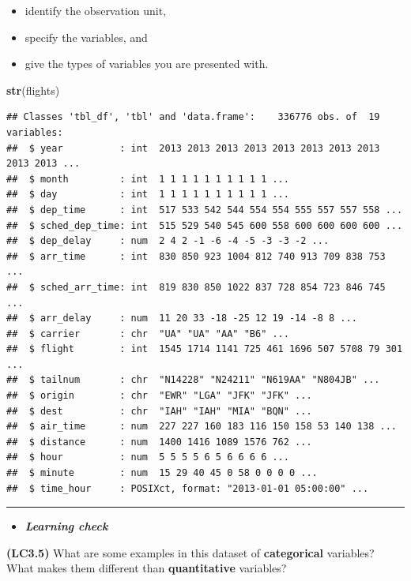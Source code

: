 \documentclass[]{tufte-book}
\newenvironment{Shaded}{\begin{snugshade}}{\end{snugshade}}
\newcommand{\KeywordTok}[1]{\textcolor[rgb]{0.13,0.29,0.53}{\textbf{{#1}}}}
\newcommand{\NormalTok}[1]{{#1}}
\providecommand{\tightlist}{%
  \setlength{\itemsep}{0pt}\setlength{\parskip}{0pt}}
\newenvironment{rmdblock}[1]
  {\begin{shaded*}
  \begin{itemize}
  \renewcommand{\labelitemi}{
    \raisebox{-.7\height}[0pt][0pt]{
    }
  }
  \item
  }
  {
  \end{itemize}
  \end{shaded*}
  }
\newenvironment{learncheck}
  {\begin{rmdblock}{warning}}
  {\end{rmdblock}}
\begin{document}
\begin{itemize}
\tightlist
\item
  identify the observation unit,
\item
  specify the variables, and
\item
  give the types of variables you are presented with.
\end{itemize}

\begin{Shaded}
\begin{Highlighting}[]
\KeywordTok{str}\NormalTok{(flights)}
\end{Highlighting}
\end{Shaded}

\begin{verbatim}
## Classes 'tbl_df', 'tbl' and 'data.frame':    336776 obs. of  19 variables:
##  $ year          : int  2013 2013 2013 2013 2013 2013 2013 2013 2013 2013 ...
##  $ month         : int  1 1 1 1 1 1 1 1 1 1 ...
##  $ day           : int  1 1 1 1 1 1 1 1 1 1 ...
##  $ dep_time      : int  517 533 542 544 554 554 555 557 557 558 ...
##  $ sched_dep_time: int  515 529 540 545 600 558 600 600 600 600 ...
##  $ dep_delay     : num  2 4 2 -1 -6 -4 -5 -3 -3 -2 ...
##  $ arr_time      : int  830 850 923 1004 812 740 913 709 838 753 ...
##  $ sched_arr_time: int  819 830 850 1022 837 728 854 723 846 745 ...
##  $ arr_delay     : num  11 20 33 -18 -25 12 19 -14 -8 8 ...
##  $ carrier       : chr  "UA" "UA" "AA" "B6" ...
##  $ flight        : int  1545 1714 1141 725 461 1696 507 5708 79 301 ...
##  $ tailnum       : chr  "N14228" "N24211" "N619AA" "N804JB" ...
##  $ origin        : chr  "EWR" "LGA" "JFK" "JFK" ...
##  $ dest          : chr  "IAH" "IAH" "MIA" "BQN" ...
##  $ air_time      : num  227 227 160 183 116 150 158 53 140 138 ...
##  $ distance      : num  1400 1416 1089 1576 762 ...
##  $ hour          : num  5 5 5 5 6 5 6 6 6 6 ...
##  $ minute        : num  15 29 40 45 0 58 0 0 0 0 ...
##  $ time_hour     : POSIXct, format: "2013-01-01 05:00:00" ...
\end{verbatim}

\begin{center}\rule{0.5\linewidth}{\linethickness}\end{center}

\begin{learncheck}
\textbf{\emph{Learning check}}
\end{learncheck}

\textbf{(LC3.5)} What are some examples in this dataset of
\textbf{categorical} variables? What makes them different than
\textbf{quantitative} variables?
\end{document}
